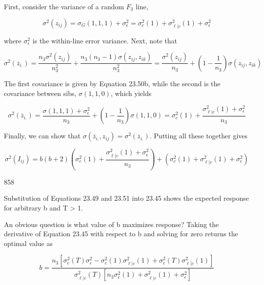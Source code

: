 \documentclass{article}
\begin{document}
First, consider the variance of a random  $ F_{3} $ line,

\begin{equation}
\sigma^{2}\left(z_{i j}\right)=\sigma_{G}(1,1,1)+\sigma_{\epsilon}^{2}=\sigma_{c}^{2}(1)+\sigma_{\ell|c}^{2}(1)+\sigma_{\epsilon}^{2}
\tag{23.50b}
\label{eq:23_50b}
\end{equation}

where  $ \sigma_{\epsilon}^{2} $ is the within-line error variance. Next, note that

\begin{equation}
\sigma^{2}\left(\overline{z}_{i.}\right)=\frac{n_{3}\sigma^{2}\left(z_{i j}\right)}{n_{3}^{2}}+\frac{n_{3}\left(n_{3}-1\right)\sigma\left(z_{i j},z_{i k}\right)}{n_{3}^{2}}=\frac{\sigma^{2}\left(z_{i j}\right)}{n_{3}}+\left(1-\frac{1}{n_{3}}\right)\sigma\left(z_{i j},z_{i k}\right)
\end{equation}

The first covariance is given by Equation 23.50b, while the second is the covariance between sibs,  $ \sigma(1,1,0) $, which yields

\begin{equation}
\sigma^{2}\left(\overline{z}_{i.}\right)=\frac{\sigma(1,1,1)+\sigma_{\epsilon}^{2}}{n_{3}}+\left(1-\frac{1}{n_{3}}\right)\sigma(1,1,0)=\sigma_{c}^{2}(1)+\frac{\sigma_{\ell|c}^{2}(1)+\sigma_{\epsilon}^{2}}{n_{3}}
\tag{23.50c}
\label{eq:23_50c}
\end{equation}

Finally, we can show that  $ \sigma\left(\overline{z}_{i.}, z_{ij}\right) = \sigma^{2}\left(\overline{z}_{i.}\right) $. Putting all these together gives

\begin{equation}
\sigma^{2}(I_{i j})=b(b+2)\left(\sigma_{c}^{2}(1)+\frac{\sigma_{\ell|c}^{2}(1)+\sigma_{\epsilon}^{2}}{n_{3}}\right)+\left(\sigma_{c}^{2}(1)+\sigma_{\ell|c}^{2}(1)+\sigma_{\epsilon}^{2}\right)
\tag{23.51}
\label{eq:23_51}
\end{equation}

858

Substitution of Equations 23.49 and 23.51 into 23.45 shows the expected response for arbitrary b and T > 1.

An obvious question is what value of b maximizes response? Taking the derivative of Equation 23.45 with respect to b and solving for zero returns the optimal value as

\begin{equation}
b=\frac{n_{3}\left[\sigma_{c}^{2}(T)\sigma_{\epsilon}^{2}-\sigma_{c}^{2}(1)\sigma_{\ell|c}^{2}(1)+\sigma_{c}^{2}(T)\sigma_{\ell|c}^{2}(1)\right]}{\sigma_{\ell|c}^{2}(T)\left[n_{3}\sigma_{c}^{2}(1)+\sigma_{\ell|c}^{2}(1)+\sigma_{\epsilon}^{2}\right]}
\tag{23.52}
\label{eq:23_52}
\end{equation}
\end{document}

